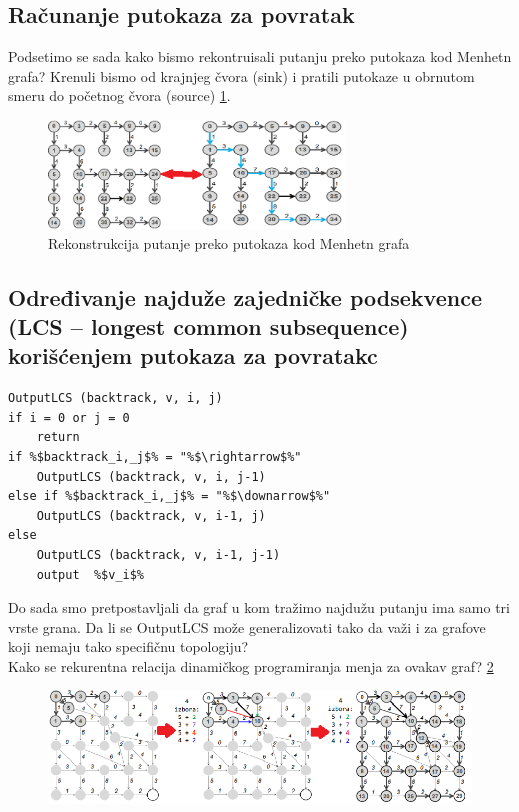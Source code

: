 \subsection{Računanje putokaza za povratak }


Podsetimo se sada kako bismo rekontruisali putanju preko putokaza kod Menhetn grafa? Krenuli bismo od krajnjeg čvora (sink) i pratili putokaze u obrnutom smeru do početnog čvora (source) \ref{slika:rek3}.
\begin{figure}[]
\centering
\includegraphics[width=0.7\textwidth]{poglavlja/5/slike/rek3.png}
\caption{Rekonstrukcija putanje preko putokaza kod Menhetn grafa}
\label{slika:rek3}
\end{figure}



\subsection{Određivanje najduže zajedničke podsekvence (LCS – longest common subsequence) korišćenjem putokaza za povratakc}

\begin{lstlisting}
OutputLCS (backtrack, v, i, j)
if i = 0 or j = 0
    return
if %$backtrack_i,_j$% = "%$\rightarrow$%"
    OutputLCS (backtrack, v, i, j-1)
else if %$backtrack_i,_j$% = "%$\downarrow$%"
    OutputLCS (backtrack, v, i-1, j)
else
    OutputLCS (backtrack, v, i-1, j-1)
    output  %$v_i$%
\end{lstlisting}

Do sada smo pretpostavljali da graf u kom tražimo
najdužu putanju ima samo tri vrste grana. Da li se OutputLCS može generalizovati tako da važi i za grafove koji nemaju tako specifičnu
topologiju?\\
Kako se rekurentna relacija dinamičkog programiranja menja za ovakav graf? \ref{slika:rekRel}
\begin{figure}[]
\centering
\includegraphics[width=\textwidth]{poglavlja/5/slike/rekurentaRelDinProg.png}
\caption{}
\label{slika:rekRel}
\end{figure}
\\

